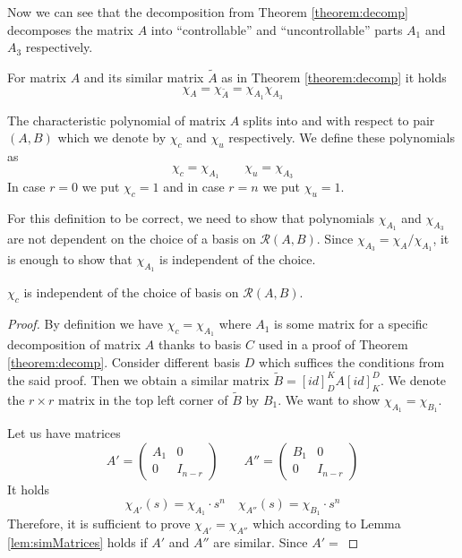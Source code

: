 Now we can see that the decomposition from Theorem \ref{theorem:decomp} decomposes the matrix $A$ into ``controllable'' and ``uncontrollable'' parts $A_1$ and $A_3$ respectively.

\begin{cor}
	For matrix $A$ and its similar matrix $\widetilde{A}$ as in Theorem \ref{theorem:decomp} it holds $$\chi_A=\chi_{\widetilde{A}}=\chi_{A_1}\chi_{A_3}$$
\end{cor} 

\begin{definition}
	The characteristic polynomial of matrix $A$ splits into  and  with respect to pair $(A,B)$ which we denote by $\chi_c$ and $\chi_u$ respectively. We define these polynomials as $$\chi_c=\chi_{A_1} \qquad \chi_u=\chi_{A_3}$$ In case $r=0$ we put $\chi_c=1$ and in case $r=n$ we put $\chi_u=1$.
\end{definition}

For this definition to be correct, we need to show that polynomials $\chi_{A_1}$ and $\chi_{A_3}$ are not dependent on the choice of a basis on $\mathcal{R}(A,B)$. Since $\chi_{A_3}=\chi_A/\chi_{A_1}$, it is enough to show that $\chi_{A_1}$ is independent of the choice.

\begin{lemma}
	$\chi_c$ is independent of the choice of basis on $\mathcal{R}(A,B)$.
\end{lemma}

\begin{proof}
	By definition we have $\chi_c=\chi_{A_1}$ where $A_1$ is some matrix for a specific decomposition of matrix $A$ thanks to basis $C$ used in a proof of Theorem \ref{theorem:decomp}. Consider different basis $D$ which suffices the conditions from the said proof. Then we obtain a similar matrix $\widetilde{B}=[id]^K_DA[id]^D_K$. We denote the $r \times r$ matrix in the top left corner of $\widetilde{B}$ by $B_1$. We want to show $\chi_{A_1}=\chi_{B_1}$.
	
	Let us have matrices
	\begin{equation*}
		A'=
		\begin{pmatrix}
			A_1 & 0 \\
			0   & I_{n-r}
		\end{pmatrix}
		\qquad
		A''=
		\begin{pmatrix}
			B_1 & 0 \\
			0   & I_{n-r}
		\end{pmatrix}
	\end{equation*}
	It holds $$\chi_{A'}(s)=\chi_{A_1}\cdot s^n \quad \chi_{A''}(s)=\chi_{B_1}\cdot s^n$$
	Therefore, it is sufficient to prove $\chi_{A'}=\chi_{A''}$ which according to Lemma \ref{lem:simMatrices} holds if $A'$ and $A''$ are similar. Since $A'=$  
\end{proof}